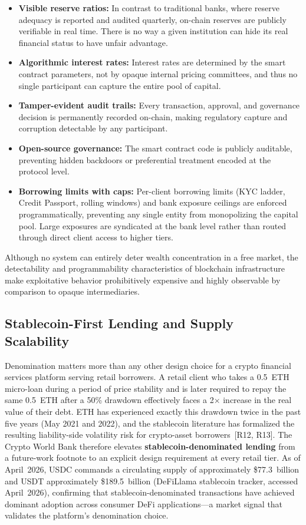 \documentclass[12pt,a4paper]{report}
\begin{document}
\begin{itemize}[noitemsep]
\item \textbf{Visible reserve ratios:} In contrast to traditional banks, where reserve adequacy is reported and audited quarterly, on-chain reserves are publicly verifiable in real time. There is no way a given institution can hide its real financial status to have unfair advantage.
\item \textbf{Algorithmic interest rates:} Interest rates are determined by the smart contract parameters, not by opaque internal pricing committees, and thus no single participant can capture the entire pool of capital.
\item \textbf{Tamper-evident audit trails:} Every transaction, approval, and governance decision is permanently recorded on-chain, making regulatory capture and corruption detectable by any participant.
\item \textbf{Open-source governance:} The smart contract code is publicly auditable, preventing hidden backdoors or preferential treatment encoded at the protocol level.
\item \textbf{Borrowing limits with caps:} Per-client borrowing limits (KYC ladder, Credit Passport, rolling windows) and bank exposure ceilings are enforced programmatically, preventing any single entity from monopolizing the capital pool. Large exposures are syndicated at the bank level rather than routed through direct client access to higher tiers.
\end{itemize}

Although no system can entirely deter wealth concentration in a free market, the detectability and programmability characteristics of blockchain infrastructure make exploitative behavior prohibitively expensive and highly observable by comparison to opaque intermediaries.

\subsection{Stablecoin-First Lending and Supply Scalability}
\label{sec:stablecoin-first}

Denomination matters more than any other design choice for a crypto financial services platform serving retail borrowers. A retail client who takes a 0.5~ETH micro-loan during a period of price stability and is later required to repay the same 0.5~ETH after a 50\% drawdown effectively faces a 2$\times$ increase in the real value of their debt. ETH has experienced exactly this drawdown twice in the past five years (May 2021 and 2022), and the stablecoin literature has formalized the resulting liability-side volatility risk for crypto-asset borrowers~[R12, R13]. The Crypto World Bank therefore elevates \textbf{stablecoin-denominated lending} from a future-work footnote to an explicit design requirement at every retail tier. As of April~2026, USDC commands a circulating supply of approximately \$77.3~billion and USDT approximately \$189.5~billion (DeFiLlama stablecoin tracker, accessed April~2026), confirming that stablecoin-denominated transactions have achieved dominant adoption across consumer DeFi applications---a market signal that validates the platform's denomination choice.
\end{document}
